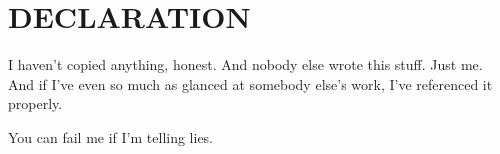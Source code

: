 \chapter{DECLARATION}

I haven't copied anything, honest. And nobody else wrote this stuff.
Just me.  And if I've even so much as glanced at somebody else's work,
I've referenced it properly.

You can fail me if I'm telling lies.




